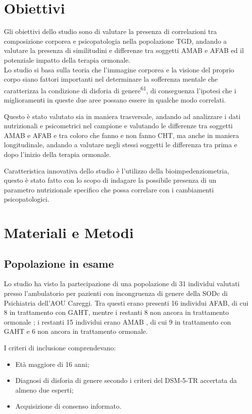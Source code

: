 \documentclass[12pt]{article}
\makeatletter
\newcommand{\cslcitation}[2]
 {\protect\hyper@linkstart{cite}{citeproc_bib_item_#1}#2\hyper@linkend}
\makeatother
\begin{document}
\section{Obiettivi}
\label{sec:orge53a35d}
Gli obiettivi dello studio sono di valutare la presenza di correlazioni tra composizione corporea e psicopatologia nella popolazione TGD, andando a valutare la presenza di similitudini e differenze tra soggetti AMAB e AFAB ed il potenziale impatto della terapia ormonale.\\
Lo studio si basa sulla teoria che l'immagine corporea e la visione del proprio corpo siano fattori importanti nel determinare la sofferenza mentale che caratterizza la condizione di disforia di genere\textsuperscript{\cslcitation{61}{61}}, di conseguenza l'ipotesi che i miglioramenti in queste due aree possano essere in qualche modo correlati.

Questo è stato valutato sia in maniera trasversale, andando ad analizzare i dati nutrizionali e psicometrici nel campione e valutando le differenze tra soggetti AMAB e AFAB e tra coloro che fanno e non fanno CHT, ma anche in maniera longitudinale, andando a valutare negli stessi soggetti le differenza tra prima e dopo l’inizio della terapia ormonale.

Caratteristica innovativa dello studio è l'utilizzo della bioimpedenziometria, questo è stato fatto con lo scopo di indagare la possibile presenza di un parametro nutrizionale specifico che possa correlare con i cambiamenti psicopatologici.
\section{Materiali e Metodi}
\label{sec:org4155901}
\subsection{Popolazione in esame}
\label{sec:orgb84894a}
Lo studio ha visto la partecipazione di  una popolazione di 31 individui valutati presso l’ambulatorio per pazienti con  incongruenza di genere della SODc di Psichiatria dell’AOU Careggi. Tra questi erano presenti 16 individui AFAB, di cui 8 in trattamento con GAHT, mentre i restanti 8 non ancora in trattamento ormonale ; i restanti 15 individui erano AMAB , di cui 9 in trattamento con GAHT e 6 non ancora in trattamento ormonale.


I criteri di inclusione comprendevano:
\begin{itemize}
\item Età maggiore di 16 anni;
\item Diagnosi di disforia di genere secondo i criteri del DSM-5-TR accertata da almeno due esperti;
\item Acquisizione di consenso informato.
\end{itemize}
\end{document}

